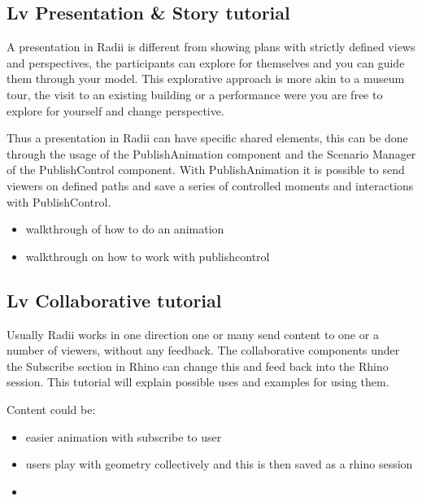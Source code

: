 \documentclass[letterpaper,10pt,english]{sphinxmanual}
\begin{document}
\sphinxstepscope


\subsection{Lv Presentation \& Story tutorial}
\label{\detokenize{tutorial/Quick_Guide/3_LV Presentation_Storry:lv-presentation-story-tutorial}}\label{\detokenize{tutorial/Quick_Guide/3_LV Presentation_Storry::doc}}
\sphinxAtStartPar
A presentation in Radii is different from showing plans with strictly defined views and perspectives, the participants can
explore for themselves and you can guide them through your model. This explorative approach
is more akin to a museum tour, the visit to an existing building or a performance were you are free to explore for yourself and change perspective.

\sphinxAtStartPar
Thus a presentation in Radii can have specific shared elements, this can be done through
the usage of the PublishAnimation component and the Scenario Manager of the PublishControl component.
With PublishAnimation it is possible to send viewers on defined paths and save a series of controlled moments and interactions with
PublishControl.
\begin{itemize}
\item {} 
\sphinxAtStartPar
walkthrough of how to do an animation

\item {} 
\sphinxAtStartPar
walkthrough on how to work with publishcontrol

\end{itemize}

\sphinxstepscope


\subsection{Lv Collaborative tutorial}
\label{\detokenize{tutorial/Quick_Guide/4_LV_Collaboration:lv-collaborative-tutorial}}\label{\detokenize{tutorial/Quick_Guide/4_LV_Collaboration::doc}}
\sphinxAtStartPar
Usually Radii works in one direction one or many send content to one or a number of viewers, without any feedback.
The collaborative components under the Subscribe section in Rhino can change this and feed back into the Rhino session.
This tutorial will explain possible uses and examples for using them.

\sphinxAtStartPar
Content could be:
\begin{itemize}
\item {} 
\sphinxAtStartPar
easier animation with subscribe to user

\item {} 
\sphinxAtStartPar
users play with geometry collectively and this is then saved as a rhino session

\item {} 
\end{itemize}
\end{document}
